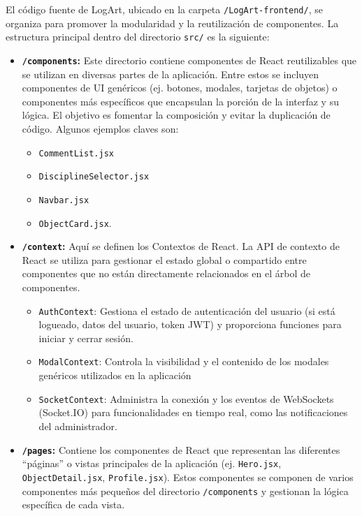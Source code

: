 El código fuente de LogArt, ubicado en la carpeta \texttt{/LogArt-frontend/}, se organiza para promover la modularidad y la reutilización de componentes. La estructura principal dentro del directorio \texttt{src/} es la siguiente:
\begin{itemize}
    \item \textbf{\texttt{/components}:} Este directorio contiene componentes de React reutilizables que se utilizan en diversas partes de la aplicación. Entre estos se incluyen componentes de UI genéricos (ej. botones, modales, tarjetas de objetos) o componentes más específicos que encapsulan la porción de la interfaz y su lógica. El objetivo es fomentar la composición y evitar la duplicación de código. Algunos ejemplos claves son:
    \begin{itemize}
        \item \texttt{CommentList.jsx}
        \item \texttt{DisciplineSelector.jsx}
        \item \texttt{Navbar.jsx}
        \item \texttt{ObjectCard.jsx}.
    \end{itemize} 
    \item \textbf{\texttt{/context}:} Aquí se definen los Contextos de React. La API de contexto de React se utiliza para gestionar el estado global o compartido entre componentes que no están directamente relacionados en el árbol de componentes.
    \begin{itemize}
        \item \texttt{AuthContext}: Gestiona el estado de autenticación del usuario (si está logueado, datos del usuario, token JWT) y proporciona funciones para iniciar y cerrar sesión.
        \item \texttt{ModalContext}: Controla la visibilidad y el contenido de los modales genéricos utilizados en la aplicación
        \item \texttt{SocketContext}: Administra la conexión y los eventos de WebSockets (Socket.IO) para funcionalidades en tiempo real, como las notificaciones del administrador.
    \end{itemize}
    \item \textbf{\texttt{/pages}:} Contiene los componentes de React que representan las diferentes ``páginas'' o vistas principales de la aplicación (ej. \texttt{Hero.jsx}, \texttt{ObjectDetail.jsx}, \texttt{Profile.jsx}). Estos componentes se componen de varios componentes más pequeños del directorio \texttt{/components} y gestionan la lógica específica de cada vista.

\end{itemize}
